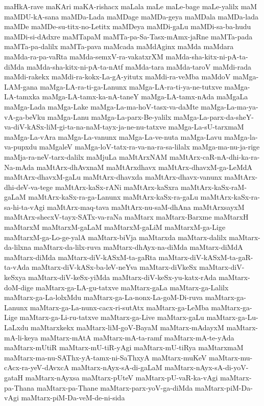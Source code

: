 {maHkA-rave
maKAri
maKA-rishacx
maLala
maLe
maLe-bage
maLe-yalilx
maM
maMDU-kA-sana
maMDa-Lada
maMDage
maMDa-geya
maMDala
maMDa-lada
maMDe
maMDe-su-titx-no-Letitx
maMDeya
maMDi-gaLu
maMDi-sa-ba-hudu
maMDi-si-dAdxre
maMTapaM
maMTa-pa-Sa-Tasx-mAmx-jaRne
maMTa-pada
maMTa-pa-dalilx
maMTa-pava
maMcada
maMdAginx
maMda
maMdara
maMda-ra-pa-vaRta
maMda-semxV-ra-vakatxrXM
maMda-sha-kitx-ni-pA-ta-diMda
maMda-sha-kitx-ni-pA-ta-nAtf
maMda-tara
maMda-taroV
maMdi-rada
maMdi-rakekx
maMdi-ra-kokx-La-gA-yitutx
maMdi-ra-veMba
maMdoV
maMga-LAM-gana
maMga-LA-ra-ti-ga-Lanunx
maMga-LA-ra-ti-ya-ne-tutxve
maMga-LA-tamxka
maMga-LA-tamx-ka-nA-taneY
maMga-LA-tamx-nAda
maMgaLa
maMga-Lada
maMga-Lake
maMga-La-ma-hoV-tasx-va-daMte
maMga-La-ma-ya-vA-ga-beVku
maMga-Lanu
maMga-La-parx-Be-yalilx
maMga-La-parx-da-sheY-va-diV-kASx-liM-gi-ta-na-naM-tayx-ja-ne-nu-tatxve
maMga-La-sU-tarxmaM
maMga-La-vAra
maMga-La-vanunx
maMga-La-ve-nuta
maMga-Lavu
maMga-la-va-pupxdu
maMgaleV
maMga-loV-tatx-ra-va-na-ra-sa-lilalx
maMga-ma-nu-ja-rige
maMja-ra-neV-tarx-dalilx
maMjuLa
maMtArxNAM
maMtArx-caR-nA-dhi-ka-ra-Na-mAda
maMtArx-dhAvxnaM
maMtArxdhavx
maMtArx-dhavxM-ga-LeMdA
maMtArx-dhavxM-gaLu
maMtArx-dhavxda
maMtArx-dhavx-vanunx
maMtArx-dhi-deV-va-tege
maMtArx-kaSx-rANi
maMtArx-kaSxra
maMtArx-kaSx-raM-gaLaM
maMtArx-kaSx-ra-ga-Lanunx
maMtArx-kaSx-ra-gaLu
maMtArx-kaSx-ra-sa-hi-ta-vAgi
maMtArx-maq-tava
maMtArx-nu-saM-dhAna
maMtArxsayxM
maMtArx-shecxV-tayx-SATx-va-raNa
maMtarx
maMtarx-Barxme
maMtarxH
maMtarxM
maMtarxM-gaLaM
maMtarxM-gaLiM
maMtarxM-ga-Lige
maMtarxM-ga-Lo-ge-yalA
maMtarx-biVja
maMtarxda
maMtarx-dalilx
maMtarx-da-lilxna
maMtarx-da-lilx-ruva
maMtarx-dhAyx-na-diMda
maMtarx-diMdA
maMtarx-diMda
maMtarx-diV-kASxM-ta-gaRta
maMtarx-diV-kASxM-ta-gaR-ta-vAda
maMtarx-diV-kASx-ba-leV-neYva
maMtarx-diVkeSx
maMtarx-diV-keSxya
maMtarx-diV-keSx-yiMda
maMtarx-diV-keSx-yu-katx-rAda
maMtarx-doM-dige
maMtarx-ga-LA-gu-tatxve
maMtarx-gaLa
maMtarx-ga-Lalilx
maMtarx-ga-La-lolxMdu
maMtarx-ga-La-nonx-La-goM-Di-ruva
maMtarx-ga-Lanunx
maMtarx-ga-La-nunx-cacx-ri-sutAtx
maMtarx-ga-LeMba
maMtarx-ga-Lige
maMtarx-ga-Li-ru-tatxve
maMtarx-ga-Live
maMtarx-gaLu
maMtarx-ga-Lu-LaLxdu
maMtarxkekx
maMtarx-liM-goV-BayaM
maMtarx-mAdayxM
maMtarx-mA-li-keya
maMtarx-mAtA
maMtarx-mA-ta-ramf
maMtarx-mA-te-yAda
maMtarx-mUtiR
maMtarx-mU-tiR-yAgi
maMtarx-mU-tiRya
maMtarxmaM
maMtarx-ma-nu-SAThx-yA-tamx-ni-SaThxyA
maMtarx-muKeV
maMtarx-mu-cAcx-ra-yeV-dAvxcA
maMtarx-nAyx-sA-di-gaLaM
maMtarx-nAyx-sA-di-yoV-gataH
maMtarx-nAyxsa
maMtarx-pUteV
maMtarx-pU-vaR-ka-vAgi
maMtarx-pa-Thana
maMtarx-pa-Thane
maMtarx-parx-yoV-ga-diMda
maMtarx-piM-Da-vAgi
maMtarx-piM-Da-veM-de-ni-sida
}
